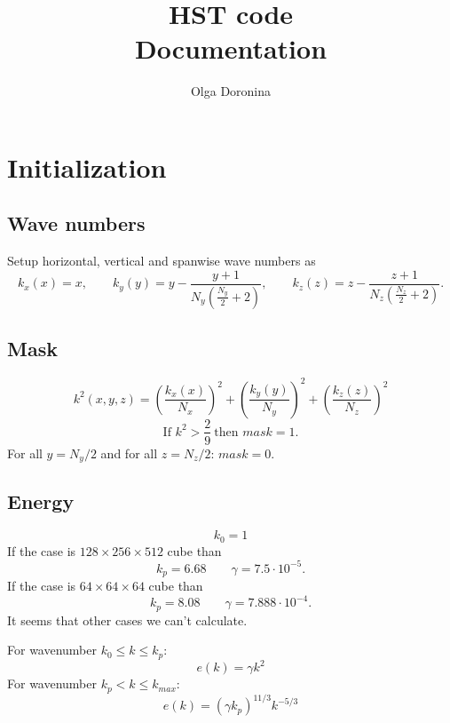 \documentclass[letterpaper,12pt,fleqn]{article}
\title{HST code\\Documentation}
\author{Olga Doronina}
\begin{document}
	\maketitle
  

\section{Initialization}
\subsection{Wave numbers}
Setup horizontal, vertical and spanwise wave numbers as
\begin{equation}
	 k_x(x) = x,\qquad 
	 k_y(y)=y-\frac{y+1}{N_y(\frac{N_y}{2}+2)},\qquad
	 k_z(z)=z-\frac{z+1}{N_z(\frac{N_z}{2}+2)}.
\end{equation}
\subsection{Mask}
\begin{equation}
	k^2(x,y,z) = \left(\frac{k_x(x)}{N_x}\right)^2+\left(\frac{k_y(y)}{N_y}\right)^2+\left(\frac{k_z(z)}{N_z}\right)^2
\end{equation}
\begin{equation}
\text{If } k^2>\frac{2}{9}\ \text{then } mask = 1. 
\end{equation}
For all $y=N_y/2$ and for all $z=N_z/2$: $mask = 0$.
\subsection{Energy}
\begin{equation}
k_0 = 1
\end{equation}
If the case is $128\times256\times512$ cube than
\begin{equation}
k_p = 6.68\qquad \gamma = 7.5\cdot 10^{-5}.
\end{equation}
If the case is $64\times64\times64$ cube than
\begin{equation}
k_p = 8.08\qquad \gamma = 7.888\cdot 10^{-4}.
\end{equation}
It seems that other cases we can't calculate.

For wavenumber $k_0\le k \le k_p$:
\begin{equation}
e(k) = \gamma k^2
\end{equation}
For wavenumber $k_p< k\le k_{max}$:
\begin{equation}
e(k) =	(\gamma k_p)^{11/3}k^{-5/3}
\end{equation}
\end{document}
